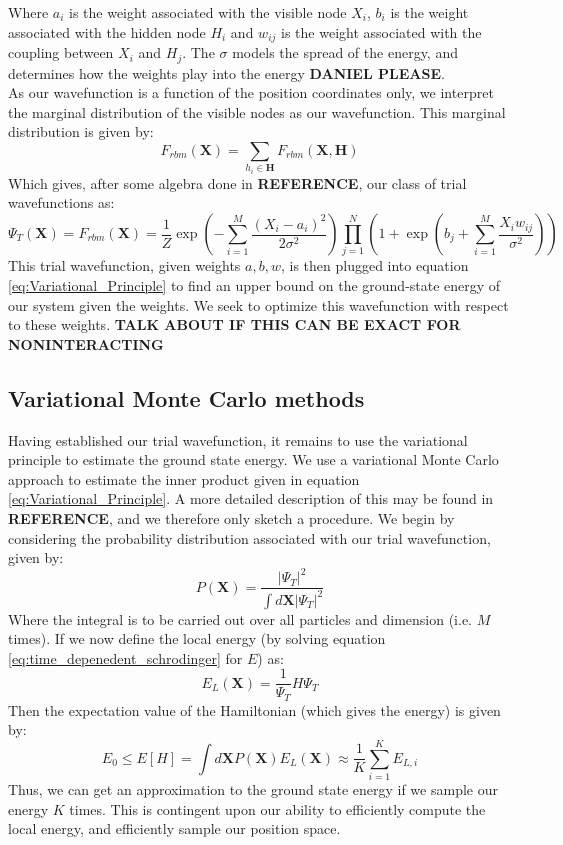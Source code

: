 \documentclass[a4paper, 10pt]{article}
\begin{document}
	Where $a_i$ is the weight associated with the visible node $X_i$, $b_i$ is the weight associated with the hidden node $H_i$ and $w_{ij}$ is the weight associated with the coupling between $X_i$ and $H_j$. The $\sigma$ models the spread of the energy, and determines how the weights play into the energy \textbf{DANIEL PLEASE}.\\
	\linebreak
	As our wavefunction is a function of the position coordinates only, we interpret the marginal distribution of the visible nodes as our wavefunction. This marginal distribution is given by:
	\begin{equation}
	F_{rbm}(\mathbf{X})=\sum_{h_i \in \mathbf{H}}F_{rbm}(\mathbf{X}, \mathbf{H})
	\end{equation}
	Which gives, after some algebra done in \textbf{REFERENCE}, our class of trial wavefunctions as:
	\begin{equation}\label{eq:Wavefunction}
	\Psi_T(\mathbf{X})=F_{rbm}(\mathbf{X})=\frac{1}{Z}\exp \left(-\sum_{i=1}^M \frac{(X_i-a_i)^2}{2\sigma^2}\right)\prod_{j=1}^{N}\left(1+\exp\left(b_j+\sum_{i=1}^M \frac{X_iw_{ij}}{\sigma^2} \right)\right)
	\end{equation}
	This trial wavefunction, given weights $a,b,w$, is then plugged into equation \ref{eq:Variational_Principle} to find an upper bound on the ground-state energy of our system given the weights. We seek to optimize this wavefunction with respect to these weights.
	\textbf{TALK ABOUT IF THIS CAN BE EXACT FOR NONINTERACTING}
	\subsection{Variational Monte Carlo methods}
	Having established our trial wavefunction, it remains to use the variational principle to estimate the ground state energy. We use a variational Monte Carlo approach to estimate the inner product given in equation \ref{eq:Variational_Principle}. A more detailed description of this may be found in \textbf{REFERENCE}, and we therefore only sketch a procedure. We begin by considering the probability distribution associated with our trial wavefunction, given by:
	\begin{equation}
	P(\mathbf{X})=\frac{|\Psi_T|^2}{\int d\mathbf{X}|\Psi_T|^2}
	\end{equation}
	Where the integral is to be carried out over all particles and dimension (i.e. $M$ times). If we now define the local energy (by solving equation \ref{eq:time_depenedent_schrodinger} for $E$) as:
	\begin{equation}\label{eq:Local_energy}
	E_L(\mathbf{X})=\frac{1}{\Psi_T}H\Psi_T
	\end{equation}
	Then the expectation value of the Hamiltonian (which gives the energy) is given by:
	\begin{equation}\label{eq:energy_in_state_space}
	E_0 \leq E[H]=\int d\mathbf{X}P(\mathbf{X})E_L(\mathbf{X})\approx \frac{1}{K}\sum_{i=1}^{K}E_{L,i}
	\end{equation}
	Thus, we can get an approximation to the ground state energy if we sample our energy $K$ times. This is contingent upon our ability to efficiently compute the local energy, and efficiently sample our position space.
\end{document}
